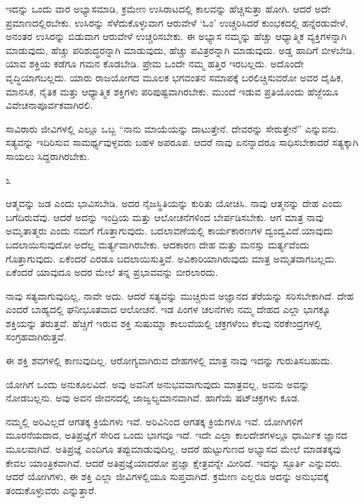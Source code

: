 ಇದನ್ನು ಒಂದು ವಾರ ಅಭ್ಯಾಸಮಾಡಿ, ಕ್ರಮೇಣ ಉಸಿರಾಟದಲ್ಲಿ ಕಾಲವನ್ನು ಹೆಚ್ಚಿಸುತ್ತಾ ಹೋಗಿ. ಆದರೆ ಅದೇ ಪ್ರಮಾಣದಲ್ಲಿರಬೇಕು. ಉಸಿರನ್ನು ಸೆಳೆದುಕೊಳ್ಳುವಾಗ ಆರುವೇಳೆ `ಓಂ' ಉಚ್ಚರಿಸಿದರೆ ಕುಂಭಕದಲ್ಲಿ ಹನ್ನೆರಡುವೇಳೆ, ಅನಂತರ ಉಸಿರನ್ನು ಬಿಡುವಾಗ ಆರುವೇಳೆ ಉಚ್ಚರಿಸಬೇಕು. ಈ ಅಭ್ಯಾಸ ನಮ್ಮನ್ನು ಹೆಚ್ಚು ಆಧ್ಯಾತ್ಮಿಕ ವ್ಯಕ್ತಿಗಳನ್ನಾಗಿ ಮಾಡುವುದು, ಹೆಚ್ಚು ಪರಿಶುದ್ಧರನ್ನಾಗಿ ಮಾಡುವುದು, ಹೆಚ್ಚು ಪವಿತ್ರರನ್ನಾಗಿ ಮಾಡುವುದು. ಅಡ್ಡ ಹಾದಿಗೆ ಬೀಳಬೇಡಿ. ಯಾವ ಶಕ್ತಿಯ ಕಡೆಗೂ ಗಮನ ಕೊಡಬೇಡಿ. ಪ್ರೇಮ ಒಂದೇ ನಮ್ಮ ಹತ್ತಿರ ಇರಬಲ್ಲದು. ಅದೊಂದೇ ವೃದ್ಧಿಯಾಗಬಲ್ಲದು. ಯಾರು ರಾಜಯೋಗದ ಮೂಲಕ ಭಗವಂತನ ಸಮಾಪಕ್ಕೆ ಬರಲಿಚ್ಚಿಸುವರೋ ಅವರ ದೈಹಿಕ, ಮಾನಸಿಕ, ನೈತಿಕ ಮತ್ತು ಆಧ್ಯಾತ್ಮಿಕ ಶಕ್ತಿಗಳು ಪರಿಪುಷ್ಟವಾಗಿರಬೇಕು. ಮುಂದೆ ಇಡುವ ಪ್ರತಿಯೊಂದು ಹೆಜ್ಜೆಯೂ ವಿವೇಚನಾಪೂರ್ವಕವಾಗಿರಲಿ.

ಸಾವಿರಾರು ಜೀವಿಗಳಲ್ಲಿ ಎಲ್ಲೂ ಒಬ್ಬ “ನಾನು ಮಾಯೆಯನ್ನು ದಾಟುತ್ತೇನೆ. ದೇವರನ್ನು ಸೇರುತ್ತೇನೆ'' ಎನ್ನುವನು. ಸತ್ಯವನ್ನು ಇದಿರಿಸುವ ಸಾಮರ್ಥ್ಯವುಳ್ಳವರು ಬಹಳ ಅಪರೂಪ. ಆದರೆ ನಾವು ಏನನ್ನಾದರೂ ಸಾಧಿಸಬೇಕಾದರೆ ಸತ್ಯಕ್ಕಾಗಿ ಸಾಯಲು ಸಿದ್ದರಾಗಿರಬೇಕು.

\begin{center}
೩
\end{center}

ಆತ್ಮವನ್ನು ಜಡ ಎಂದು ಭಾವಿಸಬೇಡಿ. ಅದರ ನೈಜಸ್ಥಿತಿಯನ್ನು ಕುರಿತು ಯೋಚಿಸಿ. ನಾವು ಆತ್ಮನನ್ನು ದೇಹ ಎಂದು ಬಗೆದಿರುವೆವು. ಆದರೆ ಅದನ್ನು ಇಂದ್ರಿಯ ಮತ್ತು ಆಲೋಚನೆಗಳಿಂದ ಬೇರ್ಪಡಿಸಬೇಕು. ಆಗ ಮಾತ್ರ ನಾವು ಅಮೃತಾತ್ಮರು ಎಂದು ನಮಗೆ ಗೊತ್ತಾಗುವುದು. ಬದಲಾವಣೆಯಲ್ಲಿ ಕಾರ್ಯಕಾರಣಗಳ ದ್ವಂದ್ವವಿದೆ.\break ಯಾವುದು ಬದಲಾಯಿಸುವುದೋ ಅದೆಲ್ಲ ಮರ್ತ್ಯವಾಗಿರಬೇಕು. ಆದಕಾರಣ ದೇಹ ಮತ್ತು ಮನಸ್ಸು ಮರ್ತ್ಯವೆಂದು ಗೊತ್ತಾಗುವುದು. ಏಕೆಂದರೆ ಎರಡೂ ಬದಲಾಯಿಸುತ್ತಿವೆ. ಅವಿಕಾರಿಯಾಗಿರುವುದು ಮಾತ್ರ ಅಮೃತವಾಗಬಲ್ಲದು. ಏಕೆಂದರೆ ಯಾವುದೂ ಅದರ ಮೇಲೆ ತನ್ನ ಪ್ರಭಾವವನ್ನು ಬೀರಲಾರದು.

ನಾವು ಸತ್ಯವಾಗುವುದಿಲ್ಲ, ನಾವೇ ಅದು. ಆದರೆ ಸತ್ಯವನ್ನು ಮುಚ್ಚಿರುವ ಅಜ್ಞಾನದ ತೆರೆಯನ್ನು ಸರಿಸಬೇಕಾಗಿದೆ. ದೇಹ ಎಂದರೆ ಬಾಹ್ಯದಲ್ಲಿ ಘನೀಭೂತವಾದ ಆಲೋಚನೆ. ಇಡ ಪಿಂಗಳ ಚಲನೆಗಳು ನಮ್ಮ ದೇಹದ ಎಲ್ಲಾ ಭಾಗಕ್ಕೂ ಶಕ್ತಿಯನ್ನು ತರುತ್ತವೆ. ಹೆಚ್ಚಿಗೆ ಇರುವ ಶಕ್ತಿ ಸುಷುಮ್ನಾ ಕಾಲುವೆಯಲ್ಲಿ ಚಕ್ರಗಳೆಂಬ ಕೆಲವು ನರಕೇಂದ್ರಗಳಲ್ಲಿ ಸಂಗ್ರಹವಾಗಿರುತ್ತವೆ.

ಈ ಶಕ್ತಿ ಶವಗಳಲ್ಲಿ ಕಾಣುವುದಿಲ್ಲ. ಆರೋಗ್ಯವಾಗಿರುವ ದೇಹಗಳಲ್ಲಿ ಮಾತ್ರ ನಾವು ಇದನ್ನು ಗುರುತಿಸಬಹುದು.

ಯೋಗಿಗೆ ಒಂದು ಅನುಕೂಲವಿದೆ. ಅವು ಅವನಿಗೆ ಅನುಭವವಾಗುವುದು ಮಾತ್ರವಲ್ಲ, ಅವನು ಅವನ್ನು ನೋಡಬಲ್ಲನು. ಅವು ಅವನ ಜೀವನದಲ್ಲಿ ಜಾಜ್ವಲ್ಯಮಾನವಾಗಿವೆ. ಹಾಗೆಯೆ ಷಟ್‌ಚಕ್ರಗಳು ಕೂಡ.

ನಮ್ಮಲ್ಲಿ ಅರಿವಿಲ್ಲದೆ ಆಗತಕ್ಕ ಕ್ರಿಯೆಗಳು ಇವೆ. ಅರಿವಿನಿಂದ ಆಗತಕ್ಕ ಕ್ರಿಯೆಗಳೂ ಇವೆ. ಯೋಗಿಗಳಿಗೆ ಮೂರನೆಯದಾದ, ಅತಿಪ್ರಜ್ಞೆಗೆ ಸೇರಿದ ಒಂದು ಭಾಗವೂ ಇದೆ. ಇದೇ ಎಲ್ಲಾ ಕಾಲದೇಶಗಳಲ್ಲೂ ಧಾರ್ಮಿಕ ಜ್ಞಾನದ ಮೂಲವಾಗಿದೆ. ಅತಿಪ್ರಜ್ಞೆ ಎಂದಿಗೂ ತಪ್ಪುಮಾಡುವುದಿಲ್ಲ. ಆದರೆ ಹುಟ್ಟುಗುಣದ ಅಭ್ಯಾಸದ ಮೇಲೆ ಮಾಡತಕ್ಕವು ಕೇವಲ ಯಾಂತ್ರಿಕವಾಗಿವೆ. ಆದರೆ ಅತಿಪ್ರಜ್ಞೆಯಾದರೋ ಪ್ರಜ್ಞಾ ಕ್ಷೇತ್ರವನ್ನೇ ಮೀರಿದೆ. ಇದನ್ನು ಸ್ಫೂರ್ತಿ ಎನ್ನುವರು. ಆದರೆ ಯೋಗಿಗಳು, ಈ ಶಕ್ತಿ ಎಲ್ಲಾ ಜೀವಿಗಳಲ್ಲಿಯೂ ಸುಪ್ತವಾಗಿದೆ. ಕ್ರಮೇಣ ಎಲ್ಲರೂ ಅದನ್ನು ಅನುಭವಕ್ಕೆ ತಂದುಕೊಳ್ಳುವರು ಎನ್ನುತ್ತಾರೆ.

